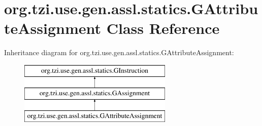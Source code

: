 \hypertarget{classorg_1_1tzi_1_1use_1_1gen_1_1assl_1_1statics_1_1_g_attribute_assignment}{\section{org.\-tzi.\-use.\-gen.\-assl.\-statics.\-G\-Attribute\-Assignment Class Reference}
\label{classorg_1_1tzi_1_1use_1_1gen_1_1assl_1_1statics_1_1_g_attribute_assignment}
}
Inheritance diagram for org.\-tzi.\-use.\-gen.\-assl.\-statics.\-G\-Attribute\-Assignment\-:\begin{figure}[H]
\begin{center}
\leavevmode
\includegraphics[height=3.000000cm]{classorg_1_1tzi_1_1use_1_1gen_1_1assl_1_1statics_1_1_g_attribute_assignment}
\end{center}
\end{figure}
